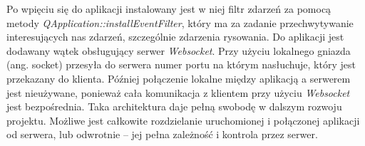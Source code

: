 Po wpięciu się do aplikacji instalowany jest w niej filtr zdarzeń za pomocą metody \emph{QApplication::installEventFilter}, który ma za zadanie przechwytywanie interesujących nas zdarzeń, szczególnie zdarzenia rysowania.
Do aplikacji jest dodawany wątek obsługujący serwer \emph{Websocket}. Przy użyciu lokalnego gniazda (ang. socket) przesyła do serwera numer portu na którym nasłuchuje, który jest przekazany do klienta. Później połączenie lokalne między aplikacją a serwerem jest nieużywane, ponieważ cała komunikacja z klientem przy użyciu \emph{Websocket} jest bezpośrednia. Taka architektura daje pełną swobodę w dalszym rozwoju projektu. Możliwe jest całkowite rozdzielanie uruchomionej i połączonej aplikacji od serwera, lub odwrotnie -- jej pełna zależność i kontrola przez serwer.